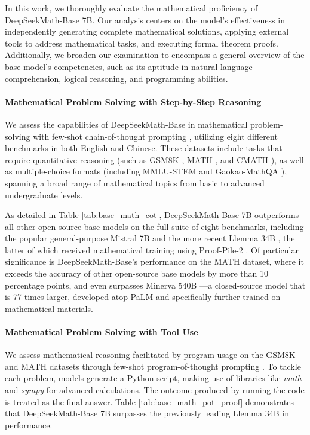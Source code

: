 \begin{itemize}[topsep=0pt]
In this work, we thoroughly evaluate the mathematical proficiency of DeepSeekMath-Base 7B. Our analysis centers on the model's effectiveness in independently generating complete mathematical solutions, applying external tools to address mathematical tasks, and executing formal theorem proofs. Additionally, we broaden our examination to encompass a general overview of the base model's competencies, such as its aptitude in natural language comprehension, logical reasoning, and programming abilities.

\paragraph{Mathematical Problem Solving with Step-by-Step Reasoning}

We assess the capabilities of DeepSeekMath-Base in mathematical problem-solving with few-shot chain-of-thought prompting \citep{cot}, utilizing eight different benchmarks in both English and Chinese. These datasets include tasks that require quantitative reasoning (such as GSM8K \citep{gsm8k}, MATH \citep{MATH}, and CMATH \citep{wei2023cmath}), as well as multiple-choice formats (including MMLU-STEM \citep{mmlu} and Gaokao-MathQA \citep{agieval}), spanning a broad range of mathematical topics from basic to advanced undergraduate levels.

As detailed in Table \ref{tab:base_math_cot}, DeepSeekMath-Base 7B outperforms all other open-source base models on the full suite of eight benchmarks, including the popular general-purpose Mistral 7B \citep{mistral} and the more recent Llemma 34B \citep{llemma}, the latter of which received mathematical training using Proof-Pile-2 \citep{llemma}. Of particular significance is DeepSeekMath-Base's performance on the MATH dataset, where it exceeds the accuracy of other open-source base models by more than 10 percentage points, and even surpasses Minerva 540B \citep{minerva}—a closed-source model that is 77 times larger, developed atop PaLM \citep{palm} and specifically further trained on mathematical materials.

\paragraph{Mathematical Problem Solving with Tool Use} We assess mathematical reasoning facilitated by program usage on the GSM8K and MATH datasets through few-shot program-of-thought prompting \citep{pot,pal}. To tackle each problem, models generate a Python script, making use of libraries like \textit{math} and \textit{sympy} for advanced calculations. The outcome produced by running the code is treated as the final answer. Table \ref{tab:base_math_pot_proof} demonstrates that DeepSeekMath-Base 7B surpasses the previously leading Llemma 34B in performance.


\end{itemize}
